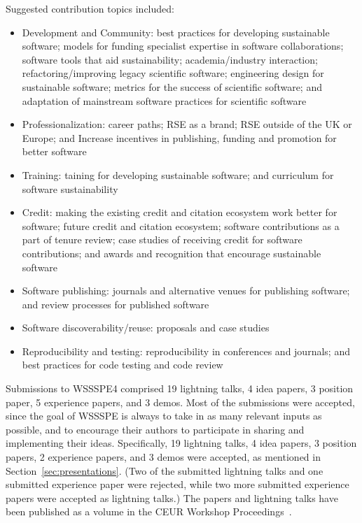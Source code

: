 \documentclass[11pt, oneside]{amsart}
\begin{document}
Suggested contribution topics included:

\begin{itemize}
\renewcommand{\labelenumi}{\textbf{\theenumi}.}
\setlength{\rightmargin}{1em}

\item Development and Community:
best practices for developing sustainable software;
models for funding specialist expertise in software collaborations;
software tools that aid sustainability;
academia/industry interaction;
refactoring/improving legacy scientific software;
engineering design for sustainable software;
metrics for the success of scientific software; and
adaptation of mainstream software practices for scientific software

\item Professionalization:
career paths;
RSE as a brand;
RSE outside of the UK or Europe; and
Increase incentives in publishing, funding and promotion for better software

\item Training:
taining for developing sustainable software; and 
curriculum for software sustainability

\item Credit:
making the existing credit and citation ecosystem work better for software;
future credit and citation ecosystem;
software contributions as a part of tenure review;
case studies of receiving credit for software contributions; and
awards and recognition that encourage sustainable software

\item Software publishing:
journals and alternative venues for publishing software; and
review processes for published software

\item Software discoverability/reuse:
proposals and case studies

\item Reproducibility and testing:
reproducibility in conferences and journals; and
best practices for code testing and code review

\end{itemize}

Submissions to WSSSPE4 comprised
19 lightning talks,
4 idea papers,
3 position paper,
5 experience papers,
and
3 demos.
Most of the submissions were accepted, since the goal of WSSSPE is always to
take in as many relevant inputs as possible, and to encourage their authors to
participate in sharing and implementing their ideas.
Specifically,
19 lightning talks,
4 idea papers,
3 position papers,
2 experience papers,
and
3 demos
were accepted, as mentioned in Section~\ref{sec:presentations}. (Two of the submitted lightning talks and one submitted experience paper were rejected, while two more submitted experience papers
were accepted as lightning talks.)
The papers and lightning talks have been published as a volume in the CEUR Workshop Proceedings~\cite{WSSSPE4-proceedings}.
\end{document}
